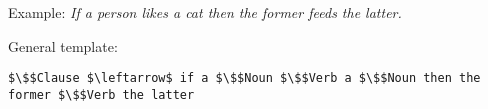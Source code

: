 \item {}
Example: {\em If a person likes a cat then the former feeds the latter.}

General template:
\begin{lstlisting}[mathescape]
$\$$Clause $\leftarrow$ if a $\$$Noun $\$$Verb a $\$$Noun then the former $\$$Verb the latter
\end{lstlisting}
